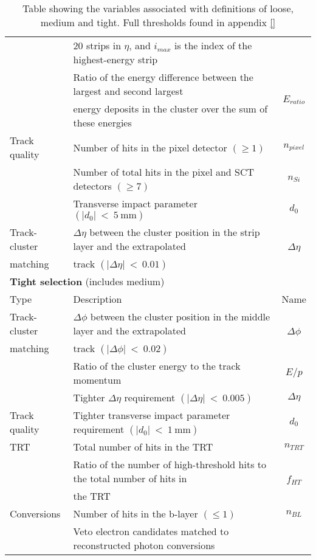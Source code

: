 \begin {table}[h!]
\begin{center}
\begin{tabular}{llc}
							& 20 strips in $\eta$, and $i_{max}$ is the index of the highest-energy strip 	& 						\\
							\rule{0pt}{3ex}
							& Ratio of the energy difference between the largest and second largest  		& \multirow{2}{*}{$E_{ratio}$}			\\
							& energy deposits in the cluster over the sum of these energies					&						\\
\rule{0pt}{4ex}Track quality	& Number of hits in the pixel detector $(\geq1)$							& $n_{pixel}$			\\
							& Number of total hits in the pixel and SCT detectors $(\geq7)$					& $n_{Si}$				\\
							& Transverse impact parameter $(|d_{0}|~<~5~\text{mm})$							& $d_{0}$				\\
\rule{0pt}{4ex}Track-cluster		& $\Delta\eta$ between the cluster position in the strip layer and the extrapolated 	& \multirow{2}{*}{$\Delta\eta$} 	\\
		matching			& track $(|\Delta\eta|~<~0.01)$													& 						\\
		\hline				
		\hline
		\multicolumn{3}{l}{{\bf Tight selection} (includes medium)}																	\\
		Type 				& Description 																	& Name 					\\
		\hline
\rule{0pt}{3ex}Track-cluster		& $\Delta\phi$ between the cluster position in the middle layer and the extrapolated 	& \multirow{2}{*}{$\Delta\phi$}	\\
		matching			& track $(|\Delta\phi|~<~0.02)$													& 						\\
							& Ratio of the cluster energy to the track momentum								& $E/p$					\\
							& Tighter $\Delta\eta$ requirement $(|\Delta\eta|~<~0.005)$						& $\Delta\eta$ 			\\
\rule{0pt}{4ex}Track quality		& Tighter transverse impact parameter requirement $(|d_{0}|~<~1~\text{mm})$		& $d_{0}$				\\
		TRT 				& Total number of hits in the TRT 												& $n_{TRT}$				\\
							& Ratio of the number of high-threshold hits to the total number of hits in 	& \multirow{2}{*}{$f_{HT}$}				\\
							& the TRT 																		& 						\\
\rule{0pt}{4ex}Conversions 	& Number of hits in the b-layer $(\leq1)$ 										& $n_{BL}$				\\
							& Veto electron candidates matched to reconstructed photon conversions 		 	& 						\\
		\hline
  		\end{tabular}
  	\caption{Table showing the variables associated with definitions of loose, medium and tight. Full thresholds found in appendix \ref{}}
  	\label{tab:Rec_lmt}
  	\end{center}
	\end {table}












